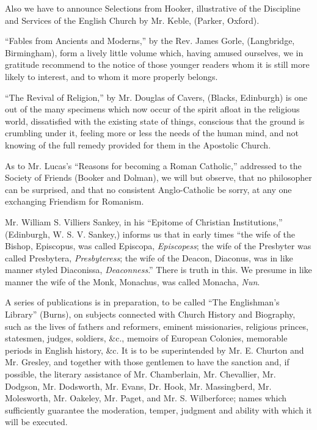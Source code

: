 Also we have to announce Selections from Hooker,
illustrative of the Discipline and Services of the English Church by Mr.
Keble, (Parker, Oxford).

``Fables from Ancients and Moderns,'' by the Rev.
James Gorle, (Langbridge, Birmingham), form a lively little volume
which, having amused ourselves, we in gratitude recommend to the notice
of those younger readers whom it is still more likely to interest, and
to whom it more properly belongs.

``The Revival of Religion,'' by Mr. Douglas of
Cavers, (Blacks, Edinburgh) is one out of the many specimens which now
occur of the spirit afloat in the religious world, dissatisfied with the
existing state of things, conscious that the ground is crumbling under
it, feeling more or less the needs of the human mind, and not knowing of
the full remedy provided for them in the Apostolic Church.

As to Mr. Lucas's ``Reasons for becoming a Roman
Catholic,'' addressed to the Society of Friends (Booker and Dolman), we
will but observe, that no philosopher can be surprised, and that no
consistent Anglo-Catholic be sorry, at any one exchanging Friendism for
Romanism.

Mr. William S. Villiers Sankey, in his ``Epitome of
Christian Institutions,'' (Edinburgh, W. S. V. Sankey,) informs us that
in early times ``the wife of the Bishop, Episcopus, was called Episcopa, \emph{Episcopess};
the wife of the Presbyter was called Presbytera, \emph{Presbyteress};
the wife of the Deacon, Diaconus, was in like manner styled Diaconissa, \emph{Deaconness}.''
There is truth in this. We presume in like manner the wife of the Monk,
Monachus, was called Monacha, \emph{Nun}.

A series of publications is in preparation, to be
called ``The Englishman's Library'' (Burns), on subjects connected with
Church History and Biography, such as the lives of fathers and
reformers, eminent missionaries, religious princes, statesmen, judges,
soldiers, \&c., memoirs of European Colonies, memorable periods in
English history, \&c. It is to be superintended by Mr. E. Churton and
Mr. Gresley, and together with those gentlemen to have the sanction and,
if possible, the literary assistance of Mr. Chamberlain, Mr. Chevallier,
Mr. Dodgson, Mr. Dodsworth, Mr. Evans, Dr. Hook, Mr. Massingberd, Mr.
Molesworth, Mr. Oakeley, Mr. Paget, and Mr. S. Wilberforce; names
which sufficiently guarantee the moderation, temper, judgment and
ability with which it will be executed.

